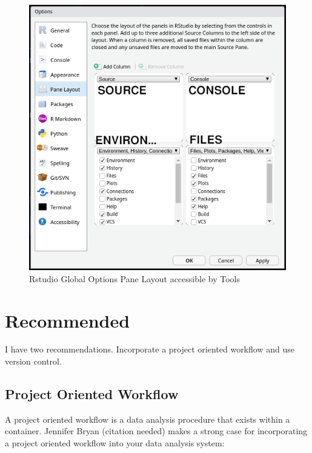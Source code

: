 \documentclass[
  letterpaper,
  DIV=11,
  numbers=noendperiod]{scrreprt}
\begin{document}
\begin{figure}

{\centering \includegraphics{./assets/rstudio-pane-layout.png}

}

\caption{Rstudio Global Options Pane Layout accessible by Tools}

\end{figure}

\hypertarget{recommended}{%
\section{Recommended}\label{recommended}}

I have two recommendations. Incorporate a project oriented workflow and
use version control.

\hypertarget{project-oriented-workflow}{%
\subsection{Project Oriented Workflow}\label{project-oriented-workflow}}

A project oriented workflow is a data analysis procedure that exists
within a container. Jennifer Bryan (citation needed) makes a strong case
for incorporating a project oriented workflow into your data analysis
system:
\end{document}
